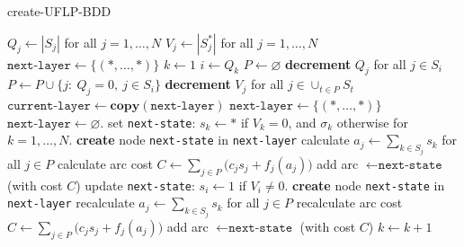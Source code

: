 \documentclass[11pt]{article}
\begin{document}
\begin{algorithm}
\scriptsize
\caption{create-UFLP-BDD}\label{alg:UFLPDD}
\begin{algorithmic}[1]
  \State $Q_j \gets |S_j|$ for all $j=1,\ldots,N$ 
  \State $V_j \gets |S^*_j|$ for all $j=1,\ldots,N$  
  \State $\texttt{next-layer} \gets \{(*, \ldots, *)\}$ 
  \State $k \gets 1$ 
    \State $i \gets Q_k$ 
    \State $P \gets \varnothing$ 
    \State \textbf{decrement} $Q_j$ for all $j\in S_i$
    \State $P \gets P\cup \{j:~Q_j = 0,~j\in S_i\}$
    \State \textbf{decrement} $V_j$ for all $j\in \cup_{t\in P} S_t$
    \State $\texttt{current-layer} \gets \textbf{copy}(\texttt{next-layer})$
      \State $\texttt{next-layer} \gets \{ (*, \ldots, *) \}$ 
    \Else
      \State $\texttt{next-layer} \gets \varnothing$.
    \EndIf
      \State set \texttt{next-state}: $s_k \gets *$ if $V_k=0$, and $\sigma_k$ otherwise for $k=1,\ldots, N$.
        \State \textbf{create} node \texttt{next-state} in \texttt{next-layer}
      \EndIf
      \State calculate $a_j \gets \sum_{k\in S_j} s_k$ for all $j\in P$
      \State calculate arc cost $C \gets \sum_{j\in P} \Big(c_j s_j + f_j(a_j)\Big)$
      \State add arc \lo{$\sigma$} $\gets \texttt{next-state}$ (with cost $C$)
      \State update \texttt{next-state}: $s_i \gets 1$ if $V_i\neq 0$.
        \State \textbf{create} node \texttt{next-state} in \texttt{next-layer}
      \EndIf
      \State recalculate $a_j \gets \sum_{k\in S_j} s_k$ for all $j\in P$
      \State recalculate arc cost $C \gets \sum_{j\in P} \Big(c_j s_j + f_j(a_j)\Big)$
      \State add arc \hi{$\sigma$} $\gets \texttt{next-state}$ (with cost $C$)
    \EndFor
    \State $k\gets k+1$
  \EndWhile
\end{algorithmic}
\end{algorithm}
\end{document}
